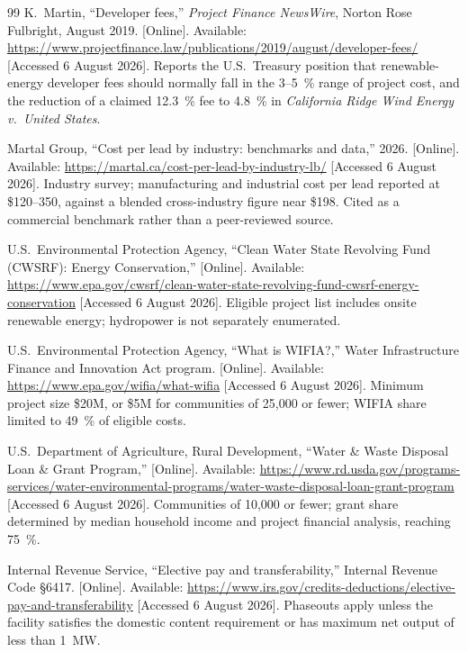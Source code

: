 \documentclass[12pt,letterpaper]{report}
\begin{document}
\begin{thebibliography}{99}
K.~Martin,
``Developer fees,''
\emph{Project Finance NewsWire}, Norton Rose Fulbright, August 2019.
[Online]. Available:
\url{https://www.projectfinance.law/publications/2019/august/developer-fees/}
[Accessed 6 August 2026]. Reports the U.S.\ Treasury position that renewable-energy
developer fees should normally fall in the 3--5~\% range of project cost, and the
reduction of a claimed 12.3~\% fee to 4.8~\% in \emph{California Ridge Wind Energy v.\
United States}.

Martal Group,
``Cost per lead by industry: benchmarks and data,'' 2026.
[Online]. Available: \url{https://martal.ca/cost-per-lead-by-industry-lb/}
[Accessed 6 August 2026]. Industry survey; manufacturing and industrial cost per lead
reported at \$120--350, against a blended cross-industry figure near \$198. Cited as a
commercial benchmark rather than a peer-reviewed source.


U.S.\ Environmental Protection Agency,
``Clean Water State Revolving Fund (CWSRF): Energy Conservation,''
[Online]. Available:
\url{https://www.epa.gov/cwsrf/clean-water-state-revolving-fund-cwsrf-energy-conservation}
[Accessed 6 August 2026]. Eligible project list includes onsite renewable energy;
hydropower is not separately enumerated.

U.S.\ Environmental Protection Agency,
``What is WIFIA?,'' Water Infrastructure Finance and Innovation Act program.
[Online]. Available: \url{https://www.epa.gov/wifia/what-wifia}
[Accessed 6 August 2026]. Minimum project size \$20M, or \$5M for communities of
25,000 or fewer; WIFIA share limited to 49~\% of eligible costs.

U.S.\ Department of Agriculture, Rural Development,
``Water \& Waste Disposal Loan \& Grant Program,''
[Online]. Available:
\url{https://www.rd.usda.gov/programs-services/water-environmental-programs/water-waste-disposal-loan-grant-program}
[Accessed 6 August 2026]. Communities of 10,000 or fewer; grant share determined by
median household income and project financial analysis, reaching 75~\%.

Internal Revenue Service,
``Elective pay and transferability,''
Internal Revenue Code \S6417.
[Online]. Available:
\url{https://www.irs.gov/credits-deductions/elective-pay-and-transferability}
[Accessed 6 August 2026]. Phaseouts apply unless the facility satisfies the domestic
content requirement or has maximum net output of less than 1~MW.


\end{thebibliography}
\end{document}
